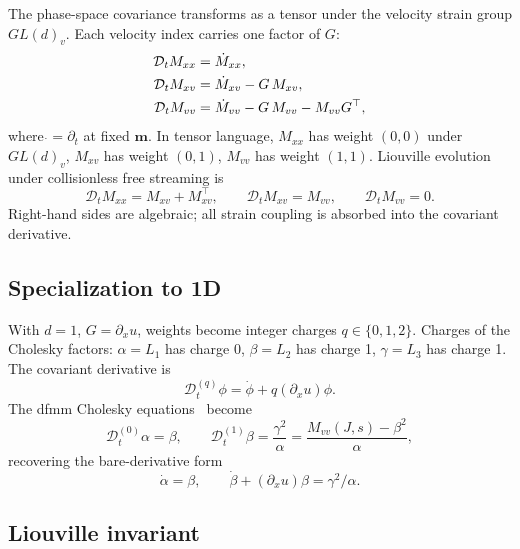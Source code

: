 \documentclass[11pt]{article}
\newcommand{\bmlab}{\bm{m}}
\begin{document}
The phase-space covariance transforms as a tensor under the velocity
strain group $GL(d)_v$. Each velocity index carries one factor of
$G$:
\begin{align}
  \mathcal{D}_t M_{xx} &= \dot{M}_{xx}, \notag\\
  \mathcal{D}_t M_{xv} &= \dot{M}_{xv} - G\,M_{xv}, \notag\\
  \mathcal{D}_t M_{vv} &= \dot{M}_{vv} - G\,M_{vv} - M_{vv} G^\top,
  \label{eq:Liouville-cov}
\end{align}
where $\dot{} = \partial_t$ at fixed $\bmlab$. In tensor language, $M_{xx}$
has weight $(0,0)$ under $GL(d)_v$, $M_{xv}$ has weight $(0,1)$,
$M_{vv}$ has weight $(1,1)$. Liouville evolution under collisionless
free streaming is
\begin{equation}
  \mathcal{D}_t M_{xx} = M_{xv} + M_{xv}^\top,\qquad
  \mathcal{D}_t M_{xv} = M_{vv},\qquad
  \mathcal{D}_t M_{vv} = 0.
  \label{eq:Liouville-clean}
\end{equation}
Right-hand sides are algebraic; all strain coupling is absorbed into
the covariant derivative.

\subsection{Specialization to 1D}

With $d=1$, $G = \partial_x u$, weights become integer charges
$q\in\{0,1,2\}$. Charges of the Cholesky factors: $\alpha = L_1$ has
charge $0$, $\beta = L_2$ has charge 1, $\gamma = L_3$ has charge 1.
The covariant derivative is
\begin{equation}
  \mathcal{D}_t^{(q)}\phi = \dot\phi + q (\partial_x u)\phi.
  \label{eq:Dt-1D}
\end{equation}
The dfmm Cholesky equations~\cite{dfmm-paper} become
\begin{equation}
  \mathcal{D}_t^{(0)}\alpha = \beta,\qquad
  \mathcal{D}_t^{(1)}\beta = \frac{\gamma^2}{\alpha} = \frac{M_{vv}(J,s)-\beta^2}{\alpha},
  \label{eq:dfmm-cov}
\end{equation}
recovering the bare-derivative form
\begin{equation}
  \dot\alpha = \beta,\qquad \dot\beta + (\partial_x u)\beta = \gamma^2/\alpha.
  \label{eq:dfmm-bare}
\end{equation}

\subsection{Liouville invariant}
\end{document}

